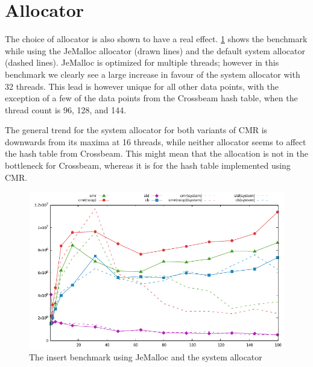 \clearpage
\section{Allocator}

The choice of allocator is also shown to have a real effect. \cref{fig:jemalloc-diff} shows the
 benchmark while using the JeMalloc allocator (drawn lines) and the default
system allocator (dashed lines).
JeMalloc is optimized for multiple threads; however in this benchmark we clearly see a large
increase in favour of the system allocator with 32 threads. This lead is however unique for all
other data points, with the exception of a few of the data points from the Crossbeam hash table,
when the thread count is 96, 128, and 144.

The general trend for the system allocator for both variants of CMR is downwards from its maxima at
16 threads, while neither allocator seems to affect the hash table from Crossbeam.
This might mean that the allocation is not in the bottleneck for Crossbeam, whereas it is for the
hash table implemented using CMR\@.

\begin{figure}[ht]
  \centering
  \includegraphics{graphs/jemalloc-difference}
  \caption{The  insert benchmark using JeMalloc and the system allocator\label{fig:jemalloc-diff}}
\end{figure}
